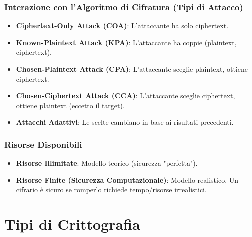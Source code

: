 \subsubsection{Interazione con l'Algoritmo di Cifratura (Tipi di Attacco)}
\begin{itemize}
    \item \textbf{Ciphertext-Only Attack (COA)}: L'attaccante ha solo ciphertext.
    \item \textbf{Known-Plaintext Attack (KPA)}: L'attaccante ha coppie (plaintext, ciphertext).
    \item \textbf{Chosen-Plaintext Attack (CPA)}: L'attaccante sceglie plaintext, ottiene ciphertext.
    \item \textbf{Chosen-Ciphertext Attack (CCA)}: L'attaccante sceglie ciphertext, ottiene plaintext (eccetto il target).
    \item \textbf{Attacchi Adattivi}: Le scelte cambiano in base ai risultati precedenti.
\end{itemize}

\subsubsection{Risorse Disponibili}
\begin{itemize}
    \item \textbf{Risorse Illimitate}: Modello teorico (sicurezza "perfetta").
    \item \textbf{Risorse Finite (Sicurezza Computazionale)}: Modello realistico. Un cifrario è sicuro se romperlo richiede tempo/risorse irrealistici.
\end{itemize}

\section{Tipi di Crittografia}

